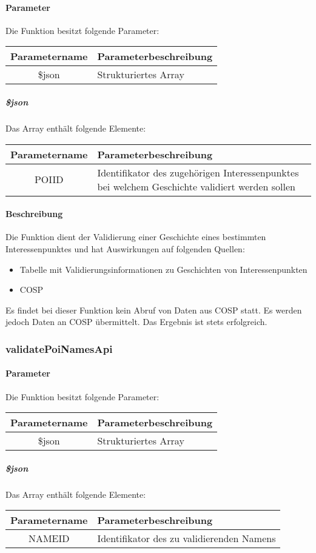 \paragraph{Parameter} Die Funktion besitzt folgende Parameter:
\begin{table}[H]
	\begin{tabular}{|c|p{11cm}|}
		\hline
		\textbf{Parametername} & \textbf{Parameterbeschreibung} \\ \hline
		\$json & Strukturiertes Array \\ \hline
	\end{tabular}
\end{table}
\subparagraph{\$json}Das Array enthält folgende Elemente:
\begin{table}[H]
	\begin{tabular}{|c|p{11cm}|}
		\hline
		\textbf{Parametername} & \textbf{Parameterbeschreibung} \\ \hline
		POIID & Identifikator des zugehörigen Interessenpunktes bei welchem Geschichte validiert werden sollen \\ \hline
	\end{tabular}
\end{table}
\paragraph{Beschreibung} Die Funktion dient der Validierung einer Geschichte eines bestimmten Interessenpunktes und hat Auswirkungen auf folgenden Quellen:
\begin{itemize}
	\item Tabelle mit Validierungsinformationen zu Geschichten von Interessenpunkten
	\item COSP
\end{itemize}
Es findet bei dieser Funktion kein Abruf von Daten aus {\glqq COSP\grqq} statt. Es werden jedoch Daten an {\glqq COSP\grqq} übermittelt. Das Ergebnis ist stets erfolgreich.
\subsubsection{validatePoiNamesApi}
\paragraph{Parameter} Die Funktion besitzt folgende Parameter:
\begin{table}[H]
	\begin{tabular}{|c|p{11cm}|}
		\hline
		\textbf{Parametername} & \textbf{Parameterbeschreibung} \\ \hline
		\$json & Strukturiertes Array \\ \hline
	\end{tabular}
\end{table}
\subparagraph{\$json}Das Array enthält folgende Elemente:
\begin{table}[H]
	\begin{tabular}{|c|p{11cm}|}
		\hline
		\textbf{Parametername} & \textbf{Parameterbeschreibung} \\ \hline
		NAMEID & Identifikator des zu validierenden Namens \\ \hline
	\end{tabular}
\end{table}
